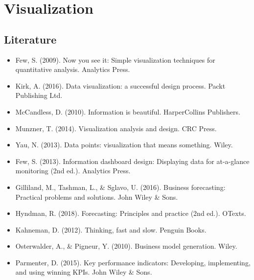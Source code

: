     \chapter{Visualization}

    \section{Literature}
    \begin{itemize}
        \item Few, S. (2009). Now you see it: Simple visualization techniques for quantitative analysis. Analytics Press.
        \item Kirk, A. (2016). Data visualization: a successful design process. Packt Publishing Ltd.
        \item McCandless, D. (2010). Information is beautiful. HarperCollins Publishers.
        \item Munzner, T. (2014). Visualization analysis and design. CRC Press.
        \item Yau, N. (2013). Data points: visualization that means something. Wiley.
        \item Few, S. (2013). Information dashboard design: Displaying data for at-a-glance monitoring (2nd ed.). Analytics Press.
        \item Gilliland, M., Tashman, L., \& Sglavo, U. (2016). Business forecasting: Practical problems and solutions. John Wiley \& Sons.
        \item Hyndman, R. (2018). Forecasting: Principles and practice (2nd ed.). OTexts.
        \item Kahneman, D. (2012). Thinking, fast and slow. Penguin Books.
        \item Osterwalder, A., \& Pigneur, Y. (2010). Business model generation. Wiley.
        \item Parmenter, D. (2015). Key performance indicators: Developing, implementing, and using winning KPIs. John Wiley \& Sons.
    \end{itemize}

